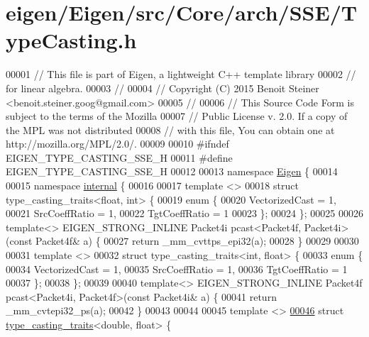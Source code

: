 \hypertarget{eigen_2_eigen_2src_2_core_2arch_2_s_s_e_2_type_casting_8h_source}{}\section{eigen/\+Eigen/src/\+Core/arch/\+S\+S\+E/\+Type\+Casting.h}
\label{eigen_2_eigen_2src_2_core_2arch_2_s_s_e_2_type_casting_8h_source}

\begin{DoxyCode}
00001 \textcolor{comment}{// This file is part of Eigen, a lightweight C++ template library}
00002 \textcolor{comment}{// for linear algebra.}
00003 \textcolor{comment}{//}
00004 \textcolor{comment}{// Copyright (C) 2015 Benoit Steiner <benoit.steiner.goog@gmail.com>}
00005 \textcolor{comment}{//}
00006 \textcolor{comment}{// This Source Code Form is subject to the terms of the Mozilla}
00007 \textcolor{comment}{// Public License v. 2.0. If a copy of the MPL was not distributed}
00008 \textcolor{comment}{// with this file, You can obtain one at http://mozilla.org/MPL/2.0/.}
00009 
00010 \textcolor{preprocessor}{#ifndef EIGEN\_TYPE\_CASTING\_SSE\_H}
00011 \textcolor{preprocessor}{#define EIGEN\_TYPE\_CASTING\_SSE\_H}
00012 
00013 \textcolor{keyword}{namespace }\hyperlink{namespace_eigen}{Eigen} \{
00014 
00015 \textcolor{keyword}{namespace }\hyperlink{namespaceinternal}{internal} \{
00016 
00017 \textcolor{keyword}{template} <>
00018 \textcolor{keyword}{struct }type\_casting\_traits<float, int> \{
00019   \textcolor{keyword}{enum} \{
00020     VectorizedCast = 1,
00021     SrcCoeffRatio = 1,
00022     TgtCoeffRatio = 1
00023   \};
00024 \};
00025 
00026 \textcolor{keyword}{template}<> EIGEN\_STRONG\_INLINE Packet4i pcast<Packet4f, Packet4i>(\textcolor{keyword}{const} Packet4f& a) \{
00027   \textcolor{keywordflow}{return} \_mm\_cvttps\_epi32(a);
00028 \}
00029 
00030 
00031 \textcolor{keyword}{template} <>
00032 \textcolor{keyword}{struct }type\_casting\_traits<int, float> \{
00033   \textcolor{keyword}{enum} \{
00034     VectorizedCast = 1,
00035     SrcCoeffRatio = 1,
00036     TgtCoeffRatio = 1
00037   \};
00038 \};
00039 
00040 \textcolor{keyword}{template}<> EIGEN\_STRONG\_INLINE Packet4f pcast<Packet4i, Packet4f>(\textcolor{keyword}{const} Packet4i& a) \{
00041   \textcolor{keywordflow}{return} \_mm\_cvtepi32\_ps(a);
00042 \}
00043 
00044 
00045 \textcolor{keyword}{template} <>
\hyperlink{struct_eigen_1_1internal_1_1type__casting__traits_3_01double_00_01float_01_4}{00046} \textcolor{keyword}{struct }\hyperlink{struct_eigen_1_1internal_1_1type__casting__traits}{type\_casting\_traits}<double, float> \{

\end{DoxyCode}
